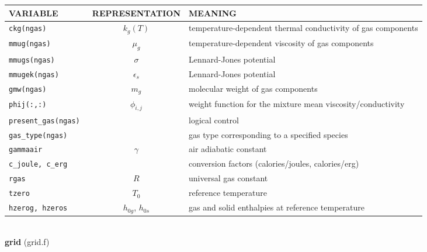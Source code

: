 \begin{tabular}{|p{6cm}|c|p{6cm}|}\hline
VARIABLE & REPRESENTATION & MEANING\\\hline
\tt  ckg(ngas)    & $k_g(T)$ & temperature-dependent thermal conductivity of gas components\\\hline
\tt  mmug(ngas)   & $\mu_g$  & temperature-dependent viscosity of gas components\\\hline
\tt  mmugs(ngas)  & $\sigma$ & Lennard-Jones potential\\\hline
\tt  mmugek(ngas) & $\epsilon_s$ & Lennard-Jones potential\\\hline
\tt  gmw(ngas)    & $m_g$    & molecular weight of gas components\\\hline
\tt  phij(:,:)    & $\phi_{i,j}$ & weight function for the mixture mean viscosity/conductivity\\\hline
\tt  present\_gas(ngas)  & & logical control  \\\hline
\tt  gas\_type(ngas)  & & gas type corresponding to a specified species  \\\hline
\tt  gammaair         & $\gamma$ & air adiabatic constant \\\hline
\tt  c\_joule, c\_erg & & conversion factors (calories/joules, calories/erg) \\\hline
\tt  rgas             & $R$ & universal gas constant \\\hline
\tt  tzero            & $T_0$ & reference temperature \\\hline
\tt  hzerog, hzeros   &$h_{0g}$, $h_{0s}$& gas and solid enthalpies at reference temperature \\\hline
\end{tabular}\\[5mm]
%
%
{\large{\bf grid}} (grid.f)\\[5mm]
